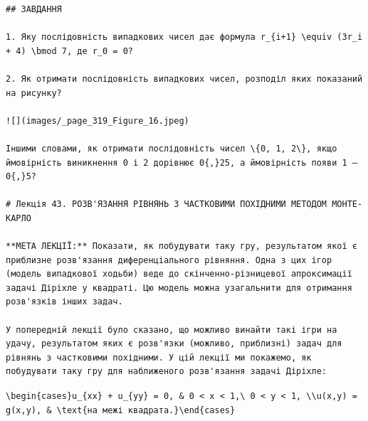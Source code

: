 \documentclass[
  ukrainian,
]{article}
\begin{document}
\begin{verbatim}
## ЗАВДАННЯ

1. Яку послідовність випадкових чисел дає формула r_{i+1} \equiv (3r_i + 4) \bmod 7, де r_0 = 0?

2. Як отримати послідовність випадкових чисел, розподіл яких показаний на рисунку?

![](images/_page_319_Figure_16.jpeg)

Іншими словами, як отримати послідовність чисел \{0, 1, 2\}, якщо ймовірність виникнення 0 і 2 дорівнює 0{,}25, а ймовірність появи 1 — 0{,}5?

# Лекція 43. РОЗВ'ЯЗАННЯ РІВНЯНЬ З ЧАСТКОВИМИ ПОХІДНИМИ МЕТОДОМ МОНТЕ-КАРЛО

**МЕТА ЛЕКЦІЇ:** Показати, як побудувати таку гру, результатом якої є приблизне розв'язання диференціального рівняння. Одна з цих ігор (модель випадкової ходьби) веде до скінченно-різницевої апроксимації задачі Діріхле у квадраті. Цю модель можна узагальнити для отримання розв'язків інших задач.

У попередній лекції було сказано, що можливо винайти такі ігри на удачу, результатом яких є розв'язки (можливо, приблизні) задач для рівнянь з частковими похідними. У цій лекції ми покажемо, як побудувати таку гру для наближеного розв'язання задачі Діріхле:
\end{verbatim}

\texttt{\textbackslash{}begin\{cases\}u\_\{xx\}\ +\ u\_\{yy\}\ =\ 0,\ \&\ 0\ \textless{}\ x\ \textless{}\ 1,\textbackslash{}\ 0\ \textless{}\ y\ \textless{}\ 1,\ \textbackslash{}\textbackslash{}u(x,y)\ =\ g(x,y),\ \&\ \textbackslash{}text\{на\ межі\ квадрата.\}\textbackslash{}end\{cases\}}
\end{document}
